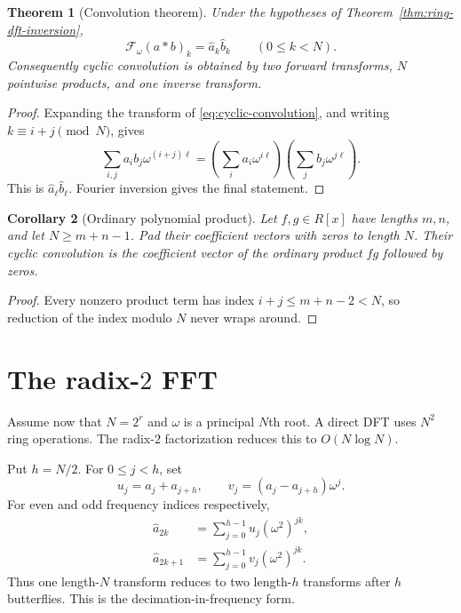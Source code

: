 \documentclass[11pt]{book}
\newtheorem{theorem}{Theorem}[section]
\newtheorem{corollary}[theorem]{Corollary}
\theoremstyle{definition}
\begin{document}
\begin{theorem}[Convolution theorem]\label{thm:ring-convolution}
Under the hypotheses of Theorem~\ref{thm:ring-dft-inversion},
\[
 \mathcal F_\omega(a*b)_k=\widehat a_k\widehat b_k
 \qquad(0\leq k<N).
\]
Consequently cyclic convolution is obtained by two forward transforms,
$N$ pointwise products, and one inverse transform.
\end{theorem}

\begin{proof}
Expanding the transform of \eqref{eq:cyclic-convolution}, and writing
$k\equiv i+j\pmod N$, gives
\[
 \sum_{i,j}a_i b_j\omega^{(i+j)\ell}
 =\left(\sum_i a_i\omega^{i\ell}\right)
  \left(\sum_j b_j\omega^{j\ell}\right).
\]
This is $\widehat a_\ell\widehat b_\ell$.  Fourier inversion gives the final
statement.
\end{proof}

\begin{corollary}[Ordinary polynomial product]\label{cor:zero-padded-convolution}
Let $f,g\in R[x]$ have lengths $m,n$, and let $N\geq m+n-1$.  Pad their
coefficient vectors with zeros to length $N$.  Their cyclic convolution is the
coefficient vector of the ordinary product $fg$ followed by zeros.
\end{corollary}

\begin{proof}
Every nonzero product term has index $i+j\leq m+n-2<N$, so reduction of the
index modulo $N$ never wraps around.
\end{proof}

\section{The radix-$2$ FFT}

Assume now that $N=2^r$ and $\omega$ is a principal $N$th root.  A direct DFT
uses $N^2$ ring operations.  The radix-$2$ factorization reduces this to
$O(N\log N)$.

Put $h=N/2$.  For $0\leq j<h$, set
\begin{equation}\label{eq:dif-butterfly}
 u_j=a_j+a_{j+h},
 \qquad
 v_j=(a_j-a_{j+h})\omega^j.
\end{equation}
For even and odd frequency indices respectively,
\begin{align}
 \widehat a_{2k}
   &=\sum_{j=0}^{h-1}u_j(\omega^2)^{jk},\label{eq:dif-even}\\
 \widehat a_{2k+1}
   &=\sum_{j=0}^{h-1}v_j(\omega^2)^{jk}.\label{eq:dif-odd}
\end{align}
Thus one length-$N$ transform reduces to two length-$h$ transforms after
$h$ butterflies.  This is the decimation-in-frequency form.
\end{document}
